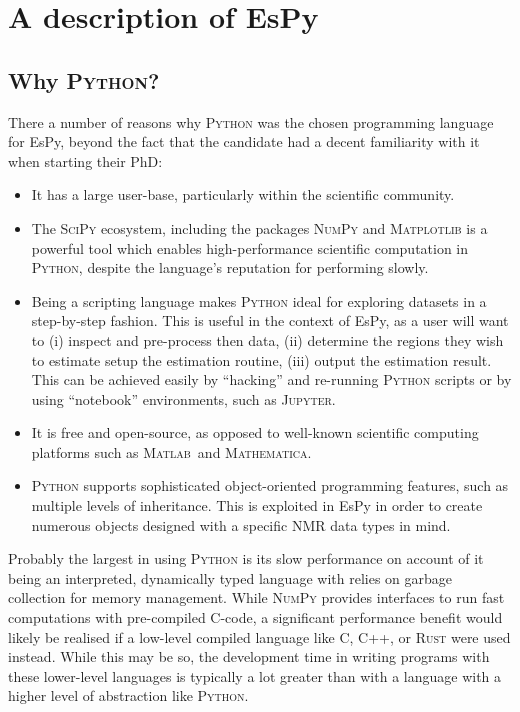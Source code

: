 \section{A description of \acs{EsPy}}

\subsection{Why \textsc{Python}?}
There a number of reasons why \textsc{Python} was the chosen programming
language for \ac{EsPy}, beyond the fact that the candidate had a decent
familiarity with it when starting their PhD:
\begin{itemize}
    \item It has a large user-base, particularly within the scientific
        community.
    \item The \textsc{SciPy} ecosystem\cite{Virtanen2020}, including the packages
        \textsc{NumPy}\cite{Harris2020} and
        \textsc{Matplotlib}\cite{Hunter2007} is a powerful tool which enables
        high-performance scientific computation in \textsc{Python}, despite the
        language's reputation for performing slowly.
    \item Being a scripting language makes \textsc{Python} ideal for
        exploring datasets in a step-by-step fashion. This is useful in the
        context of \ac{EsPy}, as a user will want to
        (i) inspect and pre-process then data,
        (ii) determine the regions they wish to estimate setup the estimation routine,
        (iii) output the estimation result.
        This can be achieved easily by ``hacking'' and re-running
        \textsc{Python} scripts or by using ``notebook'' environments, such as
        \textsc{Jupyter}.
    \item It is free and open-source, as opposed to well-known scientific
        computing platforms such as \textsc{Matlab}\textregistered\ and
        \textsc{Mathematica}.
    \item \textsc{Python} supports sophisticated object-oriented programming
        features, such as multiple levels of inheritance. This is exploited in
        \ac{EsPy} in order to create numerous objects designed with a specific
        \ac{NMR} data types in mind.
\end{itemize}

Probably the largest in using \textsc{Python} is its slow performance on
account of it being an interpreted, dynamically typed language with relies on
garbage collection for memory management. While \textsc{NumPy} provides
interfaces to run fast computations with pre-compiled C-code, a significant
performance benefit would likely be realised if a low-level compiled language
like C, C++, or \textsc{Rust} were used instead. While this may be so, the
development time in writing programs with these lower-level languages is
typically a lot greater than with a language with a higher level of abstraction
like \textsc{Python}.


